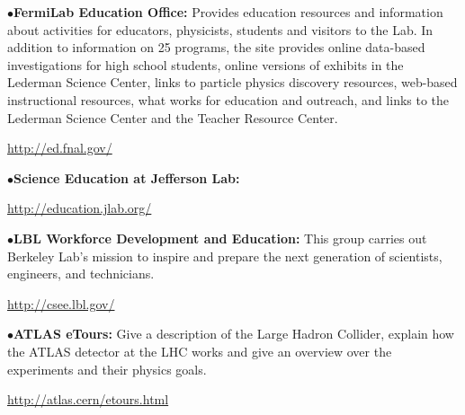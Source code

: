 \smallskip

\item{$\bullet$}{\bf FermiLab Education Office:}
Provides  education resources and information about activities for educators, physicists, students and visitors to the Lab. In addition to information on 25 programs, the site  provides online data-based investigations for high school students, online versions of exhibits in the Lederman Science Center, links to particle physics discovery resources, web-based instructional resources, what works for education and outreach, and links to the Lederman Science Center and the Teacher Resource Center.
	\item{}\qquad\url{http://ed.fnal.gov/}

\smallskip

\item{$\bullet$}{\bf Science Education at Jefferson Lab:}
	\item{}\qquad\url{http://education.jlab.org/}

\smallskip

\item{$\bullet$}{\bf LBL Workforce Development and Education:}
This group carries out Berkeley Lab’s mission to inspire and prepare the next generation of scientists, engineers, and technicians.
	\item{}\qquad\url{http://csee.lbl.gov/}

\medskip


\medskip



\medskip



\item{$\bullet$}{\bf ATLAS eTours:}
Give a description of the Large Hadron Collider, explain how the ATLAS detector at the LHC works and give an overview over the experiments and their physics goals.
	\item{}\qquad\url{http://atlas.cern/etours.html}

\smallskip


